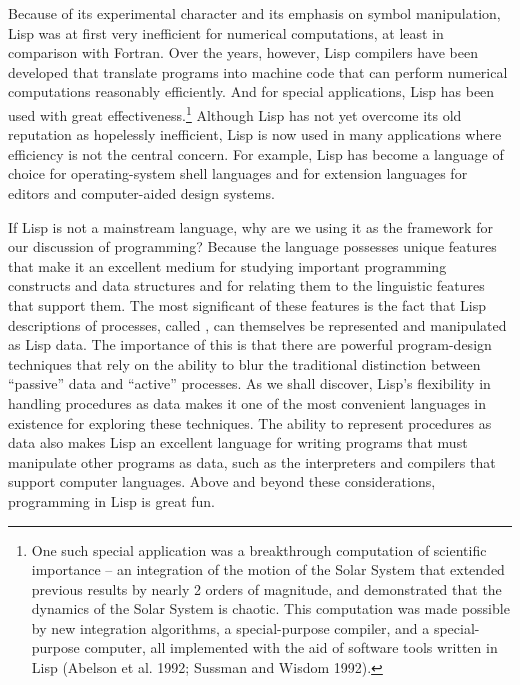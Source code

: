 Because of its experimental character and its emphasis on symbol
manipulation, Lisp was at first very inefficient for
numerical computations, at least in comparison with Fortran.  Over the
years, however, Lisp compilers have been developed that translate
programs into machine code that can perform numerical computations
reasonably efficiently.  And for special applications, Lisp has been
used with great effectiveness.\footnote{One such special application
  was a breakthrough computation of scientific importance -- an
  integration of the motion of the Solar System that extended
  previous results by nearly 2 orders of magnitude, and demonstrated
  that the dynamics of the Solar System is chaotic.  This computation
  was made possible by new integration algorithms, a special-purpose
  compiler, and a special-purpose computer, all implemented with the
  aid of software tools written in Lisp (Abelson et al. 1992; Sussman
  and Wisdom 1992).} Although Lisp has not yet overcome its old
reputation as hopelessly inefficient, Lisp is now used in many
applications where efficiency is not the central concern.  For
example, Lisp has become a language of choice for operating-system
shell languages and for extension languages for editors and
computer-aided design systems.

If Lisp is not a mainstream language, why are we using it as the
framework for our discussion of programming?  Because the language
possesses unique features that make it an excellent medium for
studying important programming constructs and data structures and for
relating them to the linguistic features that support them.  The most
significant of these features is the fact that Lisp descriptions of
processes, called , can themselves be represented and
manipulated as Lisp data.  The importance of this is that there are
powerful program-design techniques that rely on the ability to blur
the traditional distinction between ``passive'' data and ``active''
processes.  As we shall discover, Lisp's flexibility in handling
procedures as data makes it one of the most convenient languages in
existence for exploring these techniques.  The ability to represent
procedures as data also makes Lisp an excellent language for writing
programs that must manipulate other programs as data, such as the
interpreters and compilers that support computer languages.  Above and
beyond these considerations, programming in Lisp is great fun.
